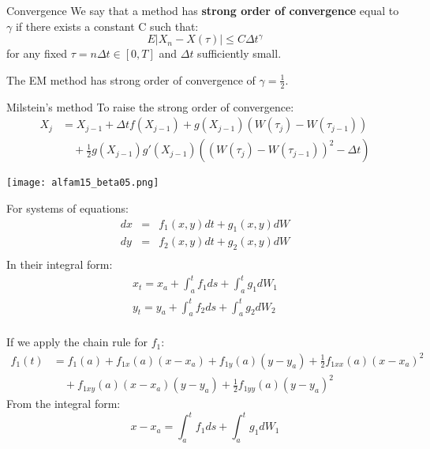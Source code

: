 \begin{frame}
\begin{block}{Convergence}
We say that a method has \textbf{strong order of convergence} equal to $\gamma$ if there exists a constant C such that:
$$E|X_n-X(\tau)|\leq C \Delta t^\gamma$$
for any fixed $\tau=n \Delta t \in [0,T]$ and $\Delta t$ sufficiently small.
\end{block}
\bigskip
The EM method has strong order of convergence of $\gamma=\frac{1}{2}$.
\end{frame}

\begin{frame}{Milstein's method}
To raise the strong order of convergence:	
	\begin{equation*}
	\begin{split}
	X_{j} & =X_{j-1}+\Delta t f(X_{j-1})+g(X_{j-1})(W(\tau_j)-W(\tau_{j-1}))\\
	  &\quad +\frac{1}{2}g(X_{j-1})g'(X_{j-1})((W(\tau_j)-W(\tau_{j-1}))^2-\Delta t)
	\end{split}
	\end{equation*}
\end{frame}

\begin{frame}
	\begin{center}
	\texttt{[image: alfam15\_beta05.png]} 
	\end{center}
\end{frame}

\begin{frame}
For systems of equations:
	\begin{eqnarray*}
		dx&=&f_1(x,y)dt+g_1(x,y)dW\\
		dy&=&f_2(x,y)dt+g_2(x,y)dW\\
	\end{eqnarray*}
In their integral form:
	\begin{eqnarray*}
		x_t=x_a+\int_{a}^{t}f_1 ds+\int_{a}^{t}g_1dW_1\\
		y_t=y_a+\int_{a}^{t}f_2 ds+\int_{a}^{t}g_2dW_2\\
	\end{eqnarray*}	
\end{frame}

\begin{frame}
If we apply the chain rule for $f_1$:
	\begin{equation*}
	\begin{split}
	f_1(t) &=f_1(a)+f_{1x}(a)(x-x_a)+f_{1y}(a)(y-y_a)+\frac{1}{2} f_{1xx}(a)(x-x_a)^2\\
		   &\quad +f_{1xy}(a)(x-x_a)(y-y_a)+\frac{1}{2}f_{1yy}(a)(y-y_a)^2
	\end{split}
	\end{equation*}
From the integral form:
	\begin{equation*}
	x-x_a=\int_{a}^{t}f_1 ds+\int_{a}^{t}g_1dW_1
	\end{equation*}

\end{frame}

